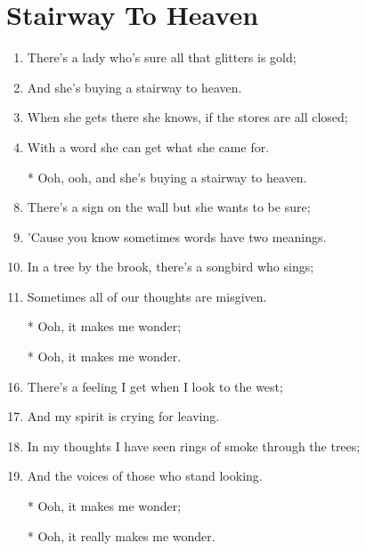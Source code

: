 \documentclass{article}
\begin{document}
    \section*{Stairway To Heaven}

    \begin{center}
            \begin{enumerate}
                \item There's a lady who's sure all that glitters is gold;
                \item And she's buying a stairway to heaven.
                \item When she gets there she knows, if the stores are all closed;
                \item With a word she can get what she came for.

                \item[]
                \item[*] Ooh, ooh, and she's buying a stairway to heaven.
                \item[]

                \item There's a sign on the wall but she wants to be sure;
                \item 'Cause you know sometimes words have two meanings.
                \item In a tree by the brook, there's a songbird who sings;
                \item Sometimes all of our thoughts are misgiven.

                \item[]
                \item[*] Ooh, it makes me wonder;
                \item[*] Ooh, it makes me wonder.
                \item[] 

                \item There's a feeling I get when I look to the west;
                \item And my spirit is crying for leaving.
                \item In my thoughts I have seen rings of smoke through the trees;
                \item And the voices of those who stand looking.

                \item[]
                \item[*] Ooh, it makes me wonder;
                \item[*] Ooh, it really makes me wonder.
                \item[] 


\end{enumerate}
\end{center}
\end{document}
